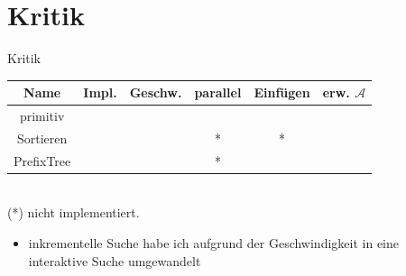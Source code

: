 \documentclass[11pt, xcolor=dvipsnames]{beamer}
\begin{document}
	\section{Kritik}
	\begin{frame}{Kritik}
		\centering
		\begin{tabular}{c|ccccc}
			\textbf{Name}	&  Impl. & Geschw. & parallel & Einfügen & erw. $\mathcal{A}$ \\ 
			\hline
			primitiv	& \cellcolor{green} & \cellcolor{orange}  & \cellcolor{green} & \cellcolor{green} & \cellcolor{green} \\ 
			Sortieren	& \cellcolor{yellow} & \cellcolor{green}  & \cellcolor{yellow} * & \cellcolor{orange} * & \cellcolor{green}\\
			PrefixTree & \cellcolor{orange}  & \cellcolor{red} & \cellcolor{orange} * & \cellcolor{green} & \cellcolor{yellow}
		\end{tabular}\\
		(*) nicht implementiert. 
		
		\begin{itemize}
			\item inkrementelle Suche habe ich aufgrund der Geschwindigkeit in eine interaktive Suche umgewandelt
		\end{itemize}
	\end{frame}
\end{document}
